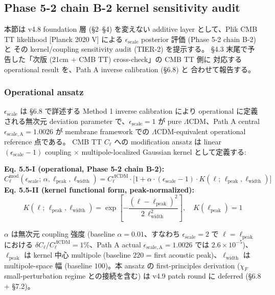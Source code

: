 \documentclass[11pt,a4paper]{ltjsarticle}
\begin{document}

\subsection{Phase 5-2 chain B-2 kernel sensitivity audit}

本節は v4.8 foundation 層 (\S 2--\S 4) を変えない additive layer
として、Plik CMB TT likelihood [Planck 2020 V] による
$\epsilon_{\mathrm{scale}}$ posterior 評価 (Phase 5-2 chain B-2) と
その kernel/coupling sensitivity audit (TIER-2) を提示する。
\S 4.3 末尾で予告した「次版 (21cm + CMB TT) cross-check」の CMB TT 側に
対応する operational result を、Path A inverse calibration (\S 6.8) と
合わせて報告する。

\subsubsection*{Operational ansatz}

$\epsilon_{\mathrm{scale}}$ は \S 6.8 で詳述する Method 1 inverse
calibration により operational に定義される無次元 deviation parameter
で、$\epsilon_{\mathrm{scale}} = 1$ が pure $\Lambda$CDM、Path A central
$\epsilon_{\mathrm{scale,A}} = 1.0026$ が membrane framework での
$\Lambda$CDM-equivalent operational reference 点である。
CMB TT $C_\ell$ への modification ansatz は
linear $(\epsilon_{\mathrm{scale}} - 1)$ coupling $\times$ multipole-localized
Gaussian kernel として定義する:

\begin{keybox}
\textbf{Eq. 5.5-I (operational, Phase 5-2 chain B-2):}
\[
C_\ell^{\mathrm{mod}}(\epsilon_{\mathrm{scale}};\, \alpha, \ell_{\mathrm{peak}}, \ell_{\mathrm{width}})
= C_\ell^{\Lambda\mathrm{CDM}} \cdot
\bigl[1 + \alpha \cdot (\epsilon_{\mathrm{scale}} - 1) \cdot K(\ell;\, \ell_{\mathrm{peak}}, \ell_{\mathrm{width}})\bigr]
\]
\textbf{Eq. 5.5-II (kernel functional form, peak-normalized):}
\[
K(\ell;\, \ell_{\mathrm{peak}}, \ell_{\mathrm{width}}) =
\exp\!\left[-\frac{(\ell - \ell_{\mathrm{peak}})^2}{2\,\ell_{\mathrm{width}}^2}\right],
\quad K(\ell_{\mathrm{peak}}) = 1
\]
\end{keybox}

\noindent
$\alpha$ は無次元 coupling 強度 (baseline $\alpha = 0.01$、すなわち
$\epsilon_{\mathrm{scale}} = 2$ で $\ell = \ell_{\mathrm{peak}}$ における
$\delta C_\ell / C_\ell^{\Lambda\mathrm{CDM}} = 1\%$、Path A actual
$\epsilon_{\mathrm{scale,A}} = 1.0026$ では $2.6 \times 10^{-5}$)、
$\ell_{\mathrm{peak}}$ は kernel 中心 multipole (baseline $220$ = first
acoustic peak)、$\ell_{\mathrm{width}}$ は multipole-space 幅 (baseline
$100$)。本 ansatz の first-principles derivation
($\chi_F$ small-perturbation regime との接続を含む) は v4.9 patch round
に deferred (\S 6.8 + \S 7.2)。
\end{document}
